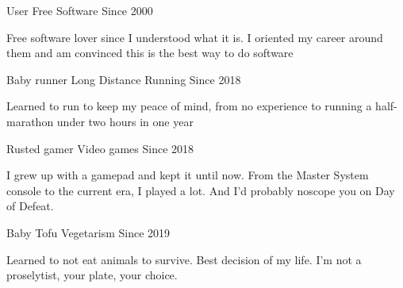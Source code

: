 


\begin{cventries}


\cventry
{User} %
{Free Software} %
{} %
{Since 2000} %
{ %
\begin{cvitems}
\item {Free software lover since I understood what it is. I oriented my career around them and am convinced this is the best way to do software}
\end{cvitems}
}


\cventry
{Baby runner} %
{Long Distance Running} %
{} %
{Since 2018} %
{ %
\begin{cvitems}
\item {Learned to run to keep my peace of mind, from no experience to running a half-marathon under two hours in one year}
\end{cvitems}
}


\cventry
{Rusted gamer} %
{Video games} %
{} %
{Since 2018} %
{ %
\begin{cvitems}
\item {I grew up with a gamepad and kept it until now. From the Master System console to the current era, I played a lot. And I'd probably noscope you on Day of Defeat.}
\end{cvitems}
}


\cventry
{Baby Tofu} %
{Vegetarism} %
{} %
{Since 2019} %
{ %
\begin{cvitems}
\item {Learned to not eat animals to survive. Best decision of my life. I'm not a proselytist, your plate, your choice.}
\end{cvitems}
}


\end{cventries}
